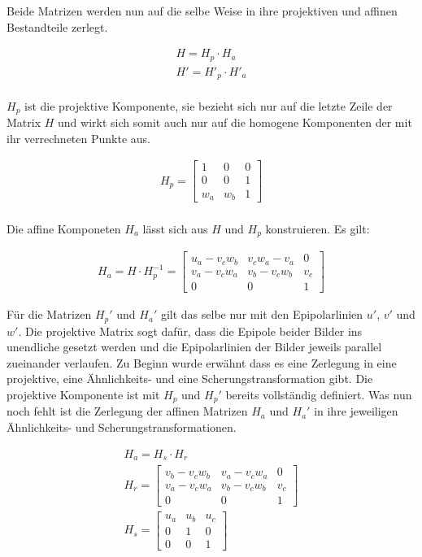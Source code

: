 Beide Matrizen werden nun auf die selbe Weise in ihre projektiven und affinen Bestandteile zerlegt.

\begin{gather}
	H = H_p \cdot H_a\\
	H' = H'_p \cdot H'_a
\end{gather}\\

$H_p$ ist die projektive Komponente, sie bezieht sich nur auf die letzte Zeile der Matrix $H$ und wirkt sich somit auch nur auf die homogene Komponenten der mit ihr verrechneten Punkte aus. 

\begin{gather}
	H_p = 
	\begin{bmatrix}
		1&0&0\\
		0&0&1\\
		w_a&w_b&1
	\end{bmatrix}
\end{gather}\\

Die affine Komponeten $H_a$ lässt sich aus $H$ und $H_p$ konstruieren. Es gilt:

\begin{gather}
	H_a= H \cdot H^{-1}_p = 
	\begin{bmatrix}
	u_a-v_cw_b&v_cw_a-v_a&0\\
	v_a-v_cw_a&v_b-v_cw_b&v_c\\
	0&0&1
	\end{bmatrix}
\end{gather}

Für die Matrizen $H_p'$ und $H_a'$ gilt das selbe nur mit den Epipolarlinien $u'$, $v'$ und $w'$.
Die projektive Matrix sogt dafür, dass die Epipole beider Bilder ins unendliche gesetzt werden und die Epipolarlinien der Bilder jeweils parallel zueinander verlaufen. Zu Beginn wurde erwähnt dass es eine Zerlegung in eine projektive, eine Ähnlichkeits- und eine Scherungstransformation gibt. Die projektive Komponente ist mit $H_p$ und $H_p'$ bereits vollständig definiert. Was nun noch fehlt ist die Zerlegung der affinen Matrizen $H_a$ und $H_a'$ in ihre jeweiligen Ähnlichkeits- und Scherungstransformationen. 

\begin{gather}
	H_a = H_s \cdot H_r\\
	H_r = 
	\begin{bmatrix}
	v_b-v_cw_b&	v_a-v_cw_a&0\\
	v_a-v_cw_a&v_b-v_cw_b&v_c\\
	0&0&1
	\end{bmatrix}\\
	H_s = 
	\begin{bmatrix}
	u_a&u_b&u_c\\
	0&1&0\\
	0&0&1
	\end{bmatrix}
\end{gather}\\

